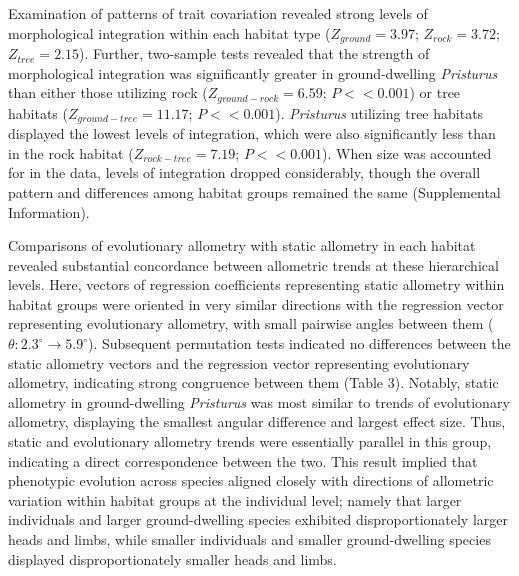 \documentclass[
  11pt,
]{article}
\begin{document}
Examination of patterns of trait covariation revealed strong levels of
morphological integration within each habitat type (\(Z_{ground}=3.97\);
\(Z_{rock}=3.72\); \(Z_{tree}=2.15\)). Further, two-sample tests
revealed that the strength of morphological integration was
significantly greater in ground-dwelling \emph{Pristurus} than either
those utilizing rock (\(Z_{ground-rock}=6.59\); \(P << 0.001\)) or tree
habitats (\(Z_{ground-tree}=11.17\); \(P << 0.001\)). \emph{Pristurus}
utilizing tree habitats displayed the lowest levels of integration,
which were also significantly less than in the rock habitat
(\(Z_{rock-tree}=7.19\); \(P << 0.001\)). When size was accounted for in
the data, levels of integration dropped considerably, though the overall
pattern and differences among habitat groups remained the same
(Supplemental Information). \hfill\break

Comparisons of evolutionary allometry with static allometry in each
habitat revealed substantial concordance between allometric trends at
these hierarchical levels. Here, vectors of regression coefficients
representing static allometry within habitat groups were oriented in
very similar directions with the regression vector representing
evolutionary allometry, with small pairwise angles between them
(\(\theta: 2.3^\circ\rightarrow5.9^\circ\)). Subsequent permutation
tests indicated no differences between the static allometry vectors and
the regression vector representing evolutionary allometry, indicating
strong congruence between them (Table 3). Notably, static allometry in
ground-dwelling \emph{Pristurus} was most similar to trends of
evolutionary allometry, displaying the smallest angular difference and
largest effect size. Thus, static and evolutionary allometry trends were
essentially parallel in this group, indicating a direct correspondence
between the two. This result implied that phenotypic evolution across
species aligned closely with directions of allometric variation within
habitat groups at the individual level; namely that larger individuals
and larger ground-dwelling species exhibited disproportionately larger
heads and limbs, while smaller individuals and smaller ground-dwelling
species displayed disproportionately smaller heads and limbs.
\hfill\break
\end{document}
